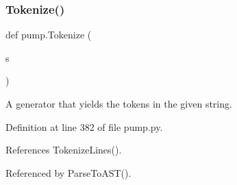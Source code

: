 \subsubsection{\texorpdfstring{Tokenize()}{Tokenize()}}
{\footnotesize\ttfamily def pump.\+Tokenize (\begin{DoxyParamCaption}\item[{}]{s }\end{DoxyParamCaption})}

\begin{DoxyVerb}A generator that yields the tokens in the given string.\end{DoxyVerb}
 

Definition at line 382 of file pump.\+py.



References Tokenize\+Lines().



Referenced by Parse\+To\+A\+S\+T().


